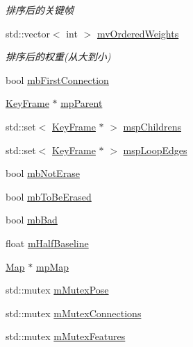 \begin{DoxyCompactItemize}
\begin{DoxyCompactList}\small\item\em 排序后的关键帧 \end{DoxyCompactList}\item 
std\+::vector$<$ int $>$ \mbox{\hyperlink{class_o_r_b___s_l_a_m2_1_1_key_frame_aeac0492454556dc98bb6bd895acfec9b}{mv\+Ordered\+Weights}}
\begin{DoxyCompactList}\small\item\em 排序后的权重(从大到小) \end{DoxyCompactList}\item 
bool \mbox{\hyperlink{class_o_r_b___s_l_a_m2_1_1_key_frame_a9ad3ef1653d6cfa622994bd2c1bd67c1}{mb\+First\+Connection}}
\item 
\mbox{\hyperlink{class_o_r_b___s_l_a_m2_1_1_key_frame}{Key\+Frame}} $\ast$ \mbox{\hyperlink{class_o_r_b___s_l_a_m2_1_1_key_frame_a94bbb0261caf3f1ed0c434c9fca1e886}{mp\+Parent}}
\item 
std\+::set$<$ \mbox{\hyperlink{class_o_r_b___s_l_a_m2_1_1_key_frame}{Key\+Frame}} $\ast$ $>$ \mbox{\hyperlink{class_o_r_b___s_l_a_m2_1_1_key_frame_ac647a33b4a6d158b640c5482ed57bbfe}{msp\+Childrens}}
\item 
std\+::set$<$ \mbox{\hyperlink{class_o_r_b___s_l_a_m2_1_1_key_frame}{Key\+Frame}} $\ast$ $>$ \mbox{\hyperlink{class_o_r_b___s_l_a_m2_1_1_key_frame_a64c0b63cb66f5ca99639c6c54aa67e1b}{msp\+Loop\+Edges}}
\item 
bool \mbox{\hyperlink{class_o_r_b___s_l_a_m2_1_1_key_frame_aecf677dc6fdd14e6122d0f5e09c01850}{mb\+Not\+Erase}}
\item 
bool \mbox{\hyperlink{class_o_r_b___s_l_a_m2_1_1_key_frame_ae282bb579271984c9ee0d55bac7f5dee}{mb\+To\+Be\+Erased}}
\item 
bool \mbox{\hyperlink{class_o_r_b___s_l_a_m2_1_1_key_frame_a9ed66ca840fb2288ee6b700bb4fc6858}{mb\+Bad}}
\item 
float \mbox{\hyperlink{class_o_r_b___s_l_a_m2_1_1_key_frame_a7a2a61ea9a420938b61b3843dcc8761b}{m\+Half\+Baseline}}
\item 
\mbox{\hyperlink{class_o_r_b___s_l_a_m2_1_1_map}{Map}} $\ast$ \mbox{\hyperlink{class_o_r_b___s_l_a_m2_1_1_key_frame_ab1fd59a0e3f3c32cf90c03a087ffd31b}{mp\+Map}}
\item 
std\+::mutex \mbox{\hyperlink{class_o_r_b___s_l_a_m2_1_1_key_frame_a7ca0141e2657237c4b7847512585cb49}{m\+Mutex\+Pose}}
\item 
std\+::mutex \mbox{\hyperlink{class_o_r_b___s_l_a_m2_1_1_key_frame_a30315bba6d290ec12227cf9c0aed5df1}{m\+Mutex\+Connections}}
\item 
std\+::mutex \mbox{\hyperlink{class_o_r_b___s_l_a_m2_1_1_key_frame_acb19a0cf32ad590df9794f77585e9ce8}{m\+Mutex\+Features}}
\end{DoxyCompactItemize}


